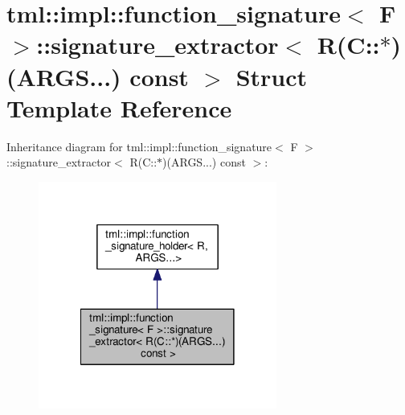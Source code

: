 \hypertarget{structtml_1_1impl_1_1function__signature_1_1signature__extractor_3_01_r_07_c_1_1_5_08_07_a_r_g_s_8_8_8_08_01const_01_01_4}{\section{tml\+:\+:impl\+:\+:function\+\_\+signature$<$ F $>$\+:\+:signature\+\_\+extractor$<$ R(C\+:\+:$\ast$)(A\+R\+G\+S...) const $>$ Struct Template Reference}
\label{structtml_1_1impl_1_1function__signature_1_1signature__extractor_3_01_r_07_c_1_1_5_08_07_a_r_g_s_8_8_8_08_01const_01_01_4}
}


Inheritance diagram for tml\+:\+:impl\+:\+:function\+\_\+signature$<$ F $>$\+:\+:signature\+\_\+extractor$<$ R(C\+:\+:$\ast$)(A\+R\+G\+S...) const $>$\+:
\nopagebreak
\begin{figure}[H]
\begin{center}
\leavevmode
\includegraphics[width=222pt]{structtml_1_1impl_1_1function__signature_1_1signature__extractor_3_01_r_07_c_1_1_5_08_07_a_r_g_sdf93f025a937b70714f3441382b1dc9e}
\end{center}
\end{figure}


